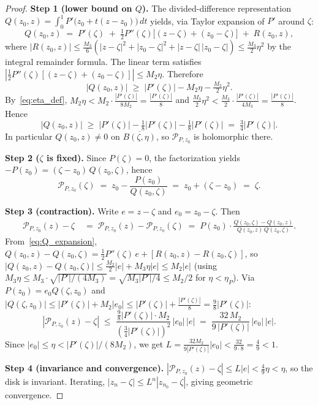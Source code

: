 \documentclass[11pt,a4paper]{article}
\theoremstyle{definition}
\begin{document}
\begin{proof}
\textbf{Step 1 (lower bound on $Q$).}  The divided-difference representation $Q(z_0,z) = \int_0^1 P'\!\bigl(z_0 + t(z-z_0)\bigr)\,dt$ yields, via Taylor expansion of $P'$ around $\zeta$:
\begin{equation}
  \label{eq:Q_expansion}
  Q(z_0, z) \;=\; P'(\zeta) \;+\; \tfrac{1}{2} P''(\zeta)\bigl[(z - \zeta) + (z_0 - \zeta)\bigr] \;+\; R(z_0, z),
\end{equation}
where $|R(z_0,z)| \leq \frac{M_3}{6}(|z-\zeta|^2 + |z_0 - \zeta|^2 + |z-\zeta|\,|z_0-\zeta|) \leq \frac{M_3}{2}\eta^2$ by the integral remainder formula.  The linear term satisfies $|\tfrac{1}{2}P''(\zeta)[(z-\zeta)+(z_0-\zeta)]| \leq M_2\eta$.  Therefore
\[
  |Q(z_0, z)| \;\geq\; |P'(\zeta)| - M_2\eta - \tfrac{M_3}{2}\eta^2.
\]
By~\eqref{eq:eta_def}, $M_2\eta < M_2 \cdot \frac{|P'(\zeta)|}{8M_2} = \frac{|P'(\zeta)|}{8}$ and $\frac{M_3}{2}\eta^2 < \frac{M_3}{2} \cdot \frac{|P'(\zeta)|}{4M_3} = \frac{|P'(\zeta)|}{8}$.  Hence
\begin{equation}
  \label{eq:Q_lower}
  |Q(z_0, z)| \;\geq\; |P'(\zeta)| - \tfrac{1}{8}|P'(\zeta)| - \tfrac{1}{8}|P'(\zeta)| \;=\; \tfrac{3}{4}|P'(\zeta)|.
\end{equation}
In particular $Q(z_0, z) \neq 0$ on $\overline{B(\zeta, \eta)}$, so $\mathcal{P}_{P,z_0}$ is holomorphic there.

\textbf{Step 2 ($\zeta$ is fixed).}  Since $P(\zeta) = 0$, the factorization yields $-P(z_0) = (\zeta - z_0)\, Q(z_0, \zeta)$, hence
\[
  \mathcal{P}_{P,z_0}(\zeta) \;=\; z_0 - \frac{P(z_0)}{Q(z_0, \zeta)} \;=\; z_0 + (\zeta - z_0) \;=\; \zeta.
\]

\textbf{Step 3 (contraction).}  Write $e = z - \zeta$ and $e_0 = z_0 - \zeta$.  Then
\begin{align*}
  \mathcal{P}_{P,z_0}(z) - \zeta
  &\;=\; \mathcal{P}_{P,z_0}(z) - \mathcal{P}_{P,z_0}(\zeta)
  \;=\; P(z_0)\cdot\frac{Q(z_0,\zeta) - Q(z_0,z)}{Q(z_0,z)\,Q(z_0,\zeta)}.
\end{align*}
From~\eqref{eq:Q_expansion}, $Q(z_0,z) - Q(z_0,\zeta) = \frac{1}{2}P''(\zeta)\,e + [R(z_0,z)-R(z_0,\zeta)]$, so $|Q(z_0,z) - Q(z_0,\zeta)| \leq \frac{M_2}{2}|e| + M_3\eta|e| \leq M_2|e|$ (using $M_3\eta \leq M_3 \cdot \sqrt{|P'|/(4M_3)} = \sqrt{M_3|P'|/4} \leq M_2/2$ for $\eta < \eta_P$).  Via $P(z_0) = e_0 Q(\zeta,z_0)$ and $|Q(\zeta,z_0)| \leq |P'(\zeta)| + M_2|e_0| \leq |P'(\zeta)| + \frac{|P'(\zeta)|}{8} = \frac{9}{8}|P'(\zeta)|$:
\begin{equation}
  \label{eq:error_main}
  |\mathcal{P}_{P,z_0}(z) - \zeta|
  \;\leq\;
  \frac{\frac{9}{8}|P'(\zeta)| \cdot M_2}{(\frac{3}{4}|P'(\zeta)|)^2}\,|e_0|\,|e|
  \;=\;
  \frac{32\, M_2}{9\,|P'(\zeta)|}\,|e_0|\,|e|.
\end{equation}
Since $|e_0| \leq \eta < |P'(\zeta)|/(8M_2)$, we get $L = \frac{32 M_2}{9|P'(\zeta)|}|e_0| < \frac{32}{9 \cdot 8} = \frac{4}{9} < 1$.

\textbf{Step 4 (invariance and convergence).}  $|\mathcal{P}_{P,z_0}(z) - \zeta| \leq L|e| < \frac{4}{9}\eta < \eta$, so the disk is invariant.  Iterating, $|z_n - \zeta| \leq L^n |z_{n_0} - \zeta|$, giving geometric convergence.
\end{proof}
\end{document}
